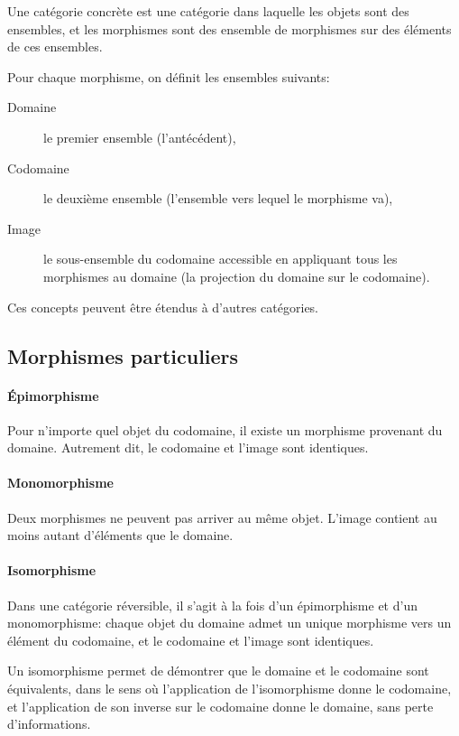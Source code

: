 \documentclass[a4paper,10pt,french,openany]{memoir}
\begin{document}
Une catégorie concrète est une catégorie dans laquelle les objets sont des ensembles, et les morphismes sont des ensemble de morphismes sur des éléments de ces ensembles.

Pour chaque morphisme, on définit les ensembles suivants:
\begin{description}
 \item[Domaine] le premier ensemble (l'antécédent),
 \item[Codomaine] le deuxième ensemble (l'ensemble vers lequel le morphisme va),
 \item[Image] le sous-ensemble du codomaine accessible en appliquant tous les morphismes au domaine (la projection du domaine sur le codomaine).
\end{description}

Ces concepts peuvent être étendus à d'autres catégories.

\subsection{Morphismes particuliers}

\paragraph{Épimorphisme}
Pour n'importe quel objet du codomaine, il existe un morphisme provenant du domaine. Autrement dit, le codomaine et l'image sont identiques.

\paragraph{Monomorphisme}
Deux morphismes ne peuvent pas arriver au même objet. L'image contient au moins autant d'éléments que le domaine.

\paragraph{Isomorphisme}
Dans une catégorie réversible, il s'agit à la fois d'un épimorphisme et d'un monomorphisme: chaque objet du domaine admet un unique morphisme vers un élément du codomaine, et le codomaine et l'image sont identiques.

Un isomorphisme permet de démontrer que le domaine et le codomaine sont équivalents, dans le sens où l'application de l'isomorphisme donne le codomaine, et l'application de son inverse sur le codomaine donne le domaine, sans perte d'informations.
\end{document}
